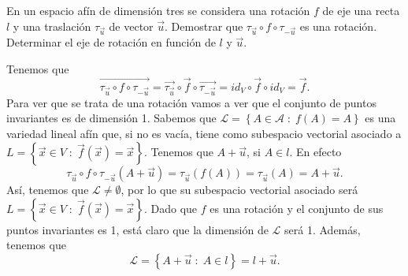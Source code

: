 \documentclass{article}
\begin{document}
\begin{ej}
En un espacio afín de dimensión tres se considera una rotación $\displaystyle f $ de eje una recta $\displaystyle l $ y una traslación $\displaystyle \tau_{\vec{u}} $ de vector $\displaystyle \vec{u} $. Demostrar que $\displaystyle \tau_{\vec{u}} \circ f \circ \tau_{-\vec{u}}$ es una rotación. Determinar el eje de rotación en función de $\displaystyle l $ y $\displaystyle \vec{u} $.
\end{ej}
\begin{sol}
Tenemos que 
\[\overrightarrow{\tau_{\vec{u}}\circ f \circ \tau_{-\vec{u}}} = \overrightarrow{\tau_{\vec{u}}}\circ \vec{f} \circ \overrightarrow{\tau_{-\vec{u}}} = id _{V} \circ \vec{f}\circ id _{V} = \vec{f} .\]
Para ver que se trata de una rotación vamos a ver que el conjunto de puntos invariantes es de dimensión 1. Sabemos que $\displaystyle \mathcal{L} = \left\{ A \in \mathcal{A} \; : \; f\left(A\right) = A\right\}  $ es una variedad lineal afín que, si no es vacía, tiene como subespacio vectorial asociado a $\displaystyle L = \left\{ \vec{x} \in V \; : \; \vec{f}\left(\vec{x}\right) = \vec{x}\right\}  $. Tenemos que $\displaystyle A + \vec{u} $, si $\displaystyle A \in l $. En efecto
\[\tau_{\vec{u}}\circ f \circ \tau_{-\vec{u}}\left(A + \vec{u}\right) = \tau_{\vec{u}}\left(f\left(A\right)\right) = \tau_{\vec{u}}\left(A\right) = A + \vec{u}	.\]
Así, tenemos que $\displaystyle \mathcal{L} \neq \emptyset $, por lo que su subespacio vectorial asociado será $\displaystyle L = \left\{ \vec{x} \in V \; : \; \vec{f}\left(\vec{x}\right) = \vec{x}\right\}  $. Dado que $\displaystyle f $ es una rotación y el conjunto de sus puntos invariantes es 1, está claro que la dimensión de $\displaystyle \mathcal{L} $ será 1. Además, tenemos que 
\[\mathcal{L} = \left\{ A + \vec{u} \; : \; A \in l\right\} = l + \vec{u} .\]
\end{sol}
\end{document}
